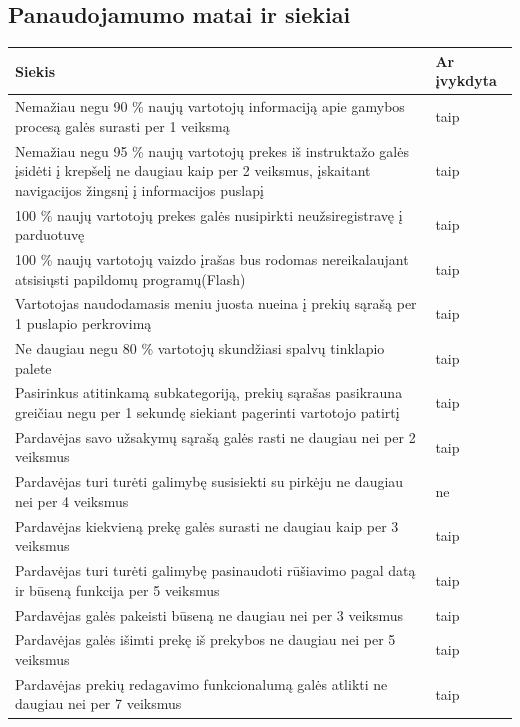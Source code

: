 \documentclass[oneside]{VUMIFPSkursinis}
\begin{document}
\subsection{Panaudojamumo matai ir siekiai}
\begin{center}
    \begin{tabular}{ |p{12cm}| p{3cm} |}
    \hline
	Siekis &Ar įvykdyta \\ \hline
	Nemažiau negu 90 \% naujų vartotojų informaciją apie gamybos procesą galės surasti per 1 veiksmą& taip \\ \hline
	Nemažiau negu 95 \% naujų vartotojų prekes iš instruktažo galės įsidėti į krepšelį ne daugiau kaip per 2 veiksmus, įskaitant navigacijos žingsnį į informacijos puslapį& taip \\ \hline
	100 \% naujų vartotojų prekes galės nusipirkti neužsiregistravę į parduotuvę& taip \\ \hline
	100 \% naujų vartotojų vaizdo įrašas bus rodomas nereikalaujant atsisiųsti papildomų programų(Flash) & taip \\ \hline
	Vartotojas naudodamasis meniu juosta nueina į prekių sąrašą per 1 puslapio perkrovimą & taip \\ \hline
	Ne daugiau negu 80 \% vartotojų skundžiasi spalvų tinklapio palete & taip \\ \hline
	Pasirinkus atitinkamą subkategoriją, prekių sąrašas pasikrauna greičiau negu per 1 sekundę siekiant pagerinti vartotojo patirtį & taip \\ \hline
	Pardavėjas savo užsakymų sąrašą galės rasti ne daugiau nei per 2 veiksmus & taip \\ \hline
	Pardavėjas turi turėti galimybę susisiekti su pirkėju ne daugiau nei per 4 veiksmus & ne \\ \hline
	Pardavėjas kiekvieną prekę galės surasti ne daugiau kaip per 3 veiksmus & taip \\ \hline
	Pardavėjas turi turėti galimybę pasinaudoti rūšiavimo pagal datą ir būseną funkcija per 5 veiksmus & taip \\ \hline
	Pardavėjas galės pakeisti būseną ne daugiau nei per 3 veiksmus & taip \\ \hline
	Pardavėjas galės išimti prekę iš prekybos ne daugiau nei per 5 veiksmus & taip \\ \hline
	Pardavėjas prekių redagavimo funkcionalumą galės atlikti ne daugiau nei per 7 veiksmus & taip \\ \hline
	
	
    \end{tabular}
\end{center}
		
\end{document}
